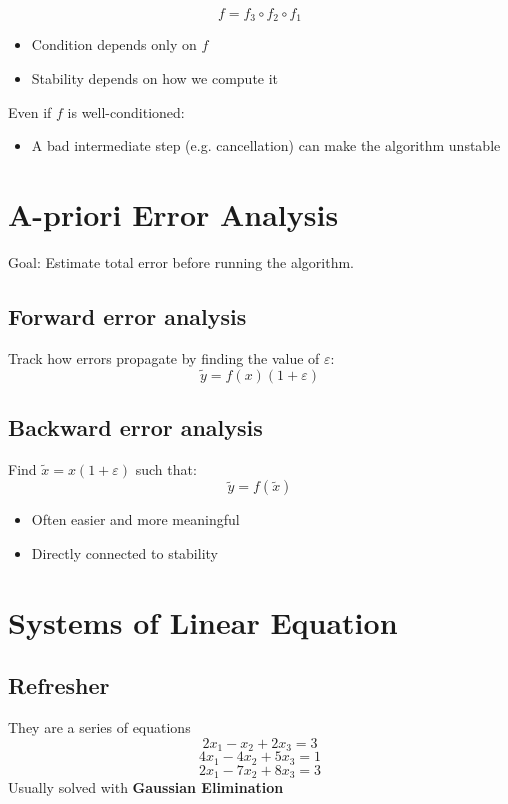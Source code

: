 \documentclass{article}
\begin{document}
\[
f = f_3 \circ f_2 \circ f_1
\]

\begin{itemize}
  \item Condition depends only on $f$
  \item Stability depends on how we compute it
\end{itemize}

Even if $f$ is well-conditioned:
\begin{itemize}
  \item A bad intermediate step (e.g. cancellation) can make the algorithm unstable
\end{itemize}

\section{A-priori Error Analysis}

Goal: Estimate total error before running the algorithm.

\subsection{Forward error analysis}

Track how errors propagate by finding the value of $\varepsilon$:
\[
\tilde{y} = f(x)(1 + \varepsilon)
\]

\subsection{Backward error analysis}

Find $\tilde{x} = x(1+\varepsilon)$ such that:
\[
\tilde{y} = f(\tilde{x})
\]

\begin{itemize}
  \item Often easier and more meaningful
  \item Directly connected to stability
\end{itemize}

\section{Systems of Linear Equation}
\subsection{Refresher}
They are a series of equations
\[2x_1 - x_2 +2x_3 = 3\]
\[4x_1 - 4x_2 +5x_3 = 1\]
\[2x_1 -7x_2 +8x_3 = 3\]
Usually solved with \textbf{Gaussian Elimination}
\end{document}
